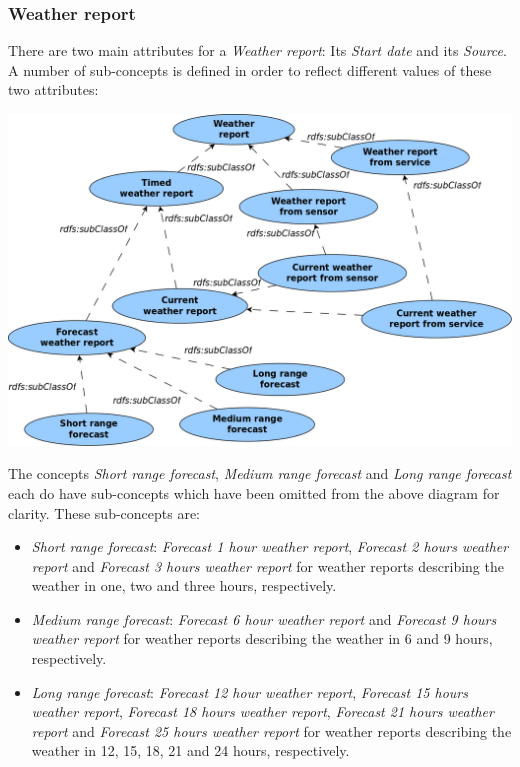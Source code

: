 \subsubsection{Weather report}

There are two main attributes for a \emph{Weather report}: Its \emph{Start date} and its \emph{Source}. A number of sub-concepts is defined in order to reflect different values of these two attributes:

\begin{center}
  \includegraphics[scale=.3]{figures/diagrams/weather-report.png}
\end{center}

The concepts \emph{Short range forecast}, \emph{Medium range forecast} and \emph{Long range forecast} each do have sub-concepts which have been omitted from the above diagram for clarity. These sub-concepts are:
\begin{itemize}
  \item \emph{Short range forecast}: \emph{Forecast 1 hour weather report}, \emph{Forecast 2 hours weather report} and \emph{Forecast 3 hours weather report} for weather reports describing the weather in one, two and three hours, respectively.
  \item \emph{Medium range forecast}: \emph{Forecast 6 hour weather report} and \emph{Forecast 9 hours weather report} for weather reports describing the weather in 6 and 9 hours, respectively.
  \item \emph{Long range forecast}: \emph{Forecast 12 hour weather report}, \emph{Forecast 15 hours weather report}, \emph{Forecast 18 hours weather report}, \emph{Forecast 21 hours weather report} and \emph{Forecast 25 hours weather report} for weather reports describing the weather in 12, 15, 18, 21 and 24 hours, respectively.
\end{itemize}


